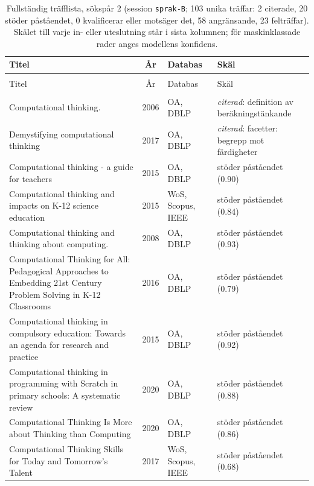 \begingroup\footnotesize
\begin{longtable}{@{}%
  >{\raggedright\arraybackslash}p{}c%
  >{\raggedright\arraybackslash}p{}%
  >{\raggedright\arraybackslash}p{}@{}}
\caption{Fullständig träfflista, sökspår 2 (session \texttt{sprak-B}; 103 unika träffar: 2 citerade, 20 stöder påståendet, 0 kvalificerar eller motsäger det, 58 angränsande, 23 felträffar).  Skälet till varje in- eller uteslutning står i sista kolumnen; för maskinklassade rader anges modellens konfidens.}\label{tab:sok-B}\\
\toprule
Titel & År & Databas & Skäl \\
\midrule
\endfirsthead
\multicolumn{4}{@{}l}{\emph{\tablename~\thetable{} (forts.)}}\\
\toprule Titel & År & Databas & Skäl \\ \midrule
\endhead
\midrule \multicolumn{4}{r@{}}{\emph{forts.\ på nästa sida}}\\
\endfoot
\bottomrule
\endlastfoot
Computational thinking. & 2006 & OA, DBLP & \emph{citerad}: definition av beräkningstänkande \\
Demystifying computational thinking & 2017 & OA, DBLP & \emph{citerad}: facetter: begrepp mot färdigheter \\
Computational thinking - a guide for teachers & 2015 & OA, DBLP & stöder påståendet (0.90) \\
Computational thinking and impacts on K-12 science education & 2015 & WoS, Scopus, IEEE & stöder påståendet (0.84) \\
Computational thinking and thinking about computing. & 2008 & OA, DBLP & stöder påståendet (0.93) \\
Computational Thinking for All: Pedagogical Approaches to Embedding 21st Century Problem Solving in K-12 Classrooms & 2016 & OA, DBLP & stöder påståendet (0.79) \\
Computational thinking in compulsory education: Towards an agenda for research and practice & 2015 & OA, DBLP & stöder påståendet (0.92) \\
Computational thinking in programming with Scratch in primary schools: A systematic review & 2020 & OA, DBLP & stöder påståendet (0.88) \\
Computational Thinking Is More about Thinking than Computing & 2020 & OA, DBLP & stöder påståendet (0.86) \\
Computational Thinking Skills for Today and Tomorrow's Talent & 2017 & WoS, Scopus, IEEE & stöder påståendet (0.68) \\

\end{longtable}
